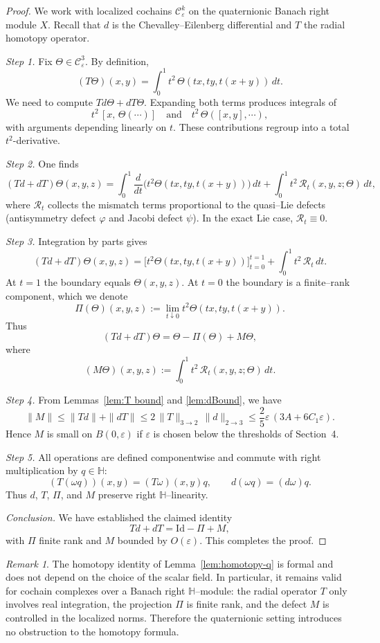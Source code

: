 \documentclass[10pt]{amsart}
\numberwithin{equation}{section}
\theoremstyle{remark}
\newtheorem{rmk}[theorem]{Remark}
\theoremstyle{definition}
\begin{document}
\begin{proof}
We work with localized cochains $\mathcal C^k_\varepsilon$ on the quaternionic Banach right module $X$.
Recall that $d$ is the Chevalley--Eilenberg differential and $T$ the radial homotopy operator.

\smallskip
\emph{Step 1. }
Fix $\Theta\in\mathcal C^3_\varepsilon$. By definition,
\[
(T\Theta)(x,y)=\int_0^1 t^2\,\Theta(tx,ty,t(x+y))\,dt.
\]
We need to compute $Td\Theta+dT\Theta$. Expanding both terms produces integrals of
\[
t^2\,[x,\,\Theta(\cdots)]\quad \text{and}\quad t^2\,\Theta([x,y],\cdots),
\]
with arguments depending linearly on $t$. These contributions regroup into a total $t^{2}$-derivative.

\smallskip
\emph{Step 2.}
One finds
\[
(Td+dT)\Theta(x,y,z)=\int_0^1 \frac{d}{dt}\Big(t^2\Theta(tx,ty,t(x+y))\Big)\,dt
+\int_0^1 t^2\,\mathcal R_t(x,y,z;\Theta)\,dt,
\]
where $\mathcal R_t$ collects the mismatch terms proportional to the quasi--Lie defects
(antisymmetry defect $\varphi$ and Jacobi defect $\psi$). In the exact Lie case, $\mathcal R_t\equiv 0$.

\smallskip
\emph{Step 3.}
Integration by parts gives
\[
(Td+dT)\Theta(x,y,z)=\Big[t^2\Theta(tx,ty,t(x+y))\Big]_{t=0}^{t=1}
+\int_0^1 t^2\,\mathcal R_t\,dt.
\]
At $t=1$ the boundary equals $\Theta(x,y,z)$.
At $t=0$ the boundary is a finite--rank component, which we denote
\[
\Pi(\Theta)(x,y,z):=\lim_{t\downarrow 0}t^2\Theta(tx,ty,t(x+y)).
\]
Thus
\[
(Td+dT)\Theta=\Theta-\Pi(\Theta)+M\Theta,
\]
where
\[
(M\Theta)(x,y,z):=\int_0^1 t^2\,\mathcal R_t(x,y,z;\Theta)\,dt.
\]

\smallskip
\emph{Step 4.}
From Lemmas~\ref{lem:T bound} and \ref{lem:dBound}, we have
\[
\|M\|\le \|Td\|+\|dT\|\le 2\,\|T\|_{3\to2}\,\|d\|_{2\to3}
\le \frac{2}{5}\varepsilon\,(3A+6C_1\varepsilon).
\]
Hence $M$ is small on $B(0,\varepsilon)$ if $\varepsilon$ is chosen below the thresholds
of Section~4.

\smallskip
\emph{Step 5.}
All operations are defined componentwise and commute with right multiplication by $q\in\mathbb H$:
\[
(T(\omega q))(x,y)=(T\omega)(x,y)q,\qquad d(\omega q)=(d\omega)q.
\]
Thus $d$, $T$, $\Pi$, and $M$ preserve right $\mathbb H$--linearity.

\smallskip
\emph{Conclusion.}
We have established the claimed identity
\[
Td+dT=\mathrm{Id}-\Pi+M,
\]
with $\Pi$ finite rank and $M$ bounded by $O(\varepsilon)$.
This completes the proof.
\end{proof}

\begin{rmk}
The homotopy identity of Lemma~\ref{lem:homotopy-q} is formal and does not
depend on the choice of the scalar field. In particular, it remains valid
for cochain complexes over a Banach right $\mathbb H$--module: the
radial operator $T$ only involves real integration, the projection $\Pi$
is finite rank, and the defect $M$ is controlled in the localized norms.
Therefore the quaternionic setting introduces no obstruction to the
homotopy formula.
\end{rmk}
\end{document}
